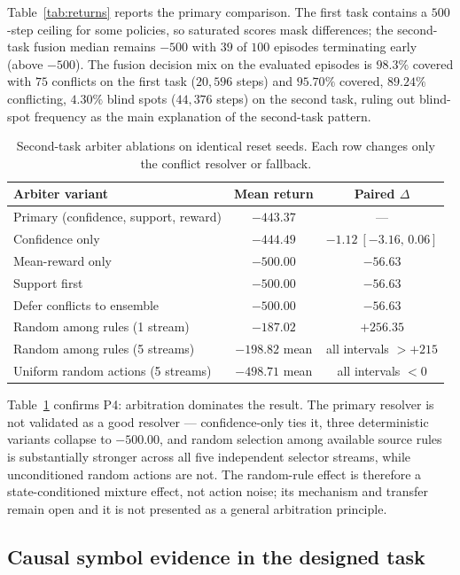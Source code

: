 \documentclass[11pt,a4paper]{article}
\theoremstyle{definition}
\begin{document}
Table~\ref{tab:returns} reports the primary comparison. The first task
contains a $500$-step ceiling for some policies, so saturated scores mask
differences; the second-task fusion median remains $-500$ with $39$ of $100$
episodes terminating early (above $-500$). The fusion decision mix on the
evaluated episodes is $98.3\%$ covered with $75$ conflicts on the first task
($20{,}596$ steps) and $95.70\%$ covered, $89.24\%$ conflicting, $4.30\%$
blind spots ($44{,}376$ steps) on the second task, ruling out blind-spot
frequency as the main explanation of the second-task pattern.

\begin{table}[t]
\centering
\caption{Second-task arbiter ablations on identical reset seeds. Each row
changes only the conflict resolver or fallback.}
\label{tab:arbitration}
{\small
\begin{tabular}{lcc}
\toprule
Arbiter variant & Mean return & Paired $\Delta$ \\
\midrule
Primary (confidence, support, reward) & $-443.37$ & --- \\
Confidence only & $-444.49$ & $-1.12\ [-3.16,\,0.06]$ \\
Mean-reward only & $-500.00$ & $-56.63$ \\
Support first & $-500.00$ & $-56.63$ \\
Defer conflicts to ensemble & $-500.00$ & $-56.63$ \\
Random among rules (1 stream) & $-187.02$ & $+256.35$ \\
Random among rules (5 streams) & $-198.82$ mean & all intervals $> +215$ \\
Uniform random actions (5 streams) & $-498.71$ mean & all intervals $< 0$ \\
\bottomrule
\end{tabular}
}
\end{table}

Table~\ref{tab:arbitration} confirms P4: arbitration dominates the result.
The primary resolver is not validated as a good resolver --- confidence-only
ties it, three deterministic variants collapse to $-500.00$, and random
selection among available source rules is substantially stronger across all
five independent selector streams, while unconditioned random actions are
not. The random-rule effect is therefore a state-conditioned mixture effect,
not action noise; its mechanism and transfer remain open and it is not
presented as a general arbitration principle.

\subsection{Causal symbol evidence in the designed task}
\end{document}
